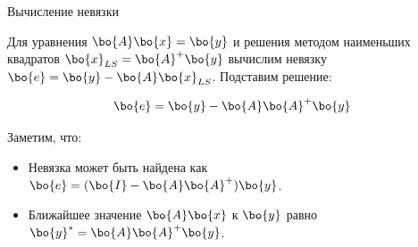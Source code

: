 \documentclass{beamer}
\begin{document}
\begin{frame}{Вычисление невязки}
	\begin{flushleft}
		
		Для уравнения $\bo{A}\bo{x} = \bo{y}$ и решения методом наименьших квадратов $\bo{x}_{LS} = \bo{A}^+\bo{y}$ вычислим невязку $\bo{e} = \bo{y} - \bo{A}\bo{x}_{LS}$. Подставим решение:
		
		\begin{equation}
			\bo{e} = \bo{y} - \bo{A}\bo{A}^+\bo{y}
		\end{equation}
		
		Заметим, что:
		
		\begin{itemize}
			\item Невязка может быть найдена как $\bo{e} = (\bo{I} - \bo{A}\bo{A}^+)\bo{y}$.
			
			\item Ближайшее значение $\bo{A}\bo{x}$ к $\bo{y}$ равно $\bo{y}^* = \bo{A}\bo{A}^+\bo{y}$.
			
		\end{itemize}
		
	\end{flushleft}
\end{frame}
\end{document}
